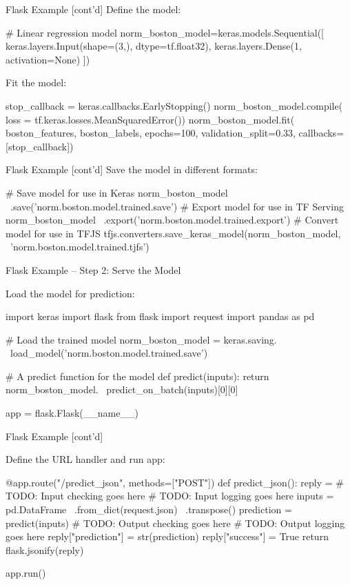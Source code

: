 \documentclass[ignorenonframetext,xcolor=x11names]{beamer}
\begin{document}
\begin{frame}[fragile]{Flask Example \small [cont'd]}
Define the model:
\begin{pythoncode}
# Linear regression model
norm_boston_model=keras.models.Sequential([
    keras.layers.Input(shape=(3,), dtype=tf.float32),
    keras.layers.Dense(1, activation=None) ])
\end{pythoncode}

Fit the model:
\begin{pythoncode}
stop_callback = keras.callbacks.EarlyStopping()
norm_boston_model.compile(
    loss = tf.keras.losses.MeanSquaredError())
norm_boston_model.fit(
    boston_features, boston_labels,
    epochs=100, validation_split=0.33,
    callbacks=[stop_callback])
\end{pythoncode}
\end{frame}

\begin{frame}[fragile]{Flask Example \small [cont'd]}
Save the model in different formats:
\begin{pythoncode}
# Save model for use in Keras
norm_boston_model \
    .save('norm.boston.model.trained.save')
# Export model for use in TF Serving
norm_boston_model \
    .export('norm.boston.model.trained.export')
# Convert model for use in TFJS
tfjs.converters.save_keras_model(norm_boston_model, \
    'norm.boston.model.trained.tjfs')
\end{pythoncode}
\end{frame}

\begin{frame}[fragile]{Flask Example -- Step 2: Serve the Model}

Load the model for prediction:
\begin{pythoncode}
import keras
import flask
from flask import request
import pandas as pd

# Load the trained model
norm_boston_model = keras.saving. \
    load_model('norm.boston.model.trained.save')

# A predict function for the model
def predict(inputs):
    return norm_boston_model. \
        predict_on_batch(inputs)[0][0]

app = flask.Flask(__name__)
\end{pythoncode}
\end{frame}

\begin{frame}[fragile]{Flask Example \small [cont'd]}

Define the URL handler and run app:
\begin{pythoncode}
@app.route("/predict_json", methods=["POST"])
def predict_json():
    reply = {}
    # TODO: Input checking goes here
    # TODO: Input logging goes here
    inputs = pd.DataFrame \
               .from_dict(request.json) \
               .transpose()
    prediction = predict(inputs)
    # TODO: Output checking goes here
    # TODO: Output logging goes here
    reply["prediction"] = str(prediction)
    reply["success"] = True
    return flask.jsonify(reply)
    
app.run()
\end{pythoncode}
\end{frame}
\end{document}
